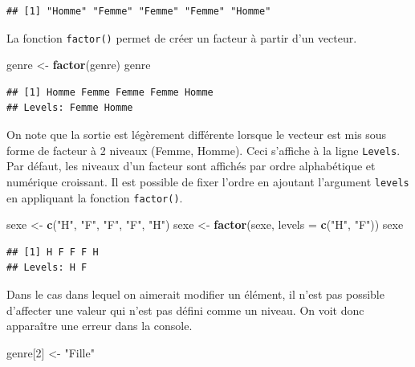 \documentclass[
]{book}
\newenvironment{Shaded}{\begin{snugshade}}{\end{snugshade}}
\newcommand{\AttributeTok}[1]{\textcolor[rgb]{0.13,0.29,0.53}{#1}}
\newcommand{\DecValTok}[1]{\textcolor[rgb]{0.00,0.00,0.81}{#1}}
\newcommand{\FunctionTok}[1]{\textcolor[rgb]{0.13,0.29,0.53}{\textbf{#1}}}
\newcommand{\NormalTok}[1]{#1}
\newcommand{\OtherTok}[1]{\textcolor[rgb]{0.56,0.35,0.01}{#1}}
\newcommand{\StringTok}[1]{\textcolor[rgb]{0.31,0.60,0.02}{#1}}
\begin{document}
\begin{verbatim}
## [1] "Homme" "Femme" "Femme" "Femme" "Homme"
\end{verbatim}

La fonction \texttt{factor()} permet de créer un facteur à partir d'un vecteur.

\begin{Shaded}
\begin{Highlighting}[]
\NormalTok{genre }\OtherTok{\textless{}{-}} \FunctionTok{factor}\NormalTok{(genre)}
\NormalTok{genre}
\end{Highlighting}
\end{Shaded}

\begin{verbatim}
## [1] Homme Femme Femme Femme Homme
## Levels: Femme Homme
\end{verbatim}

On note que la sortie est légèrement différente lorsque le vecteur est mis sous forme de facteur à 2 niveaux (Femme, Homme). Ceci s'affiche à la ligne \texttt{Levels}. Par défaut, les niveaux d'un facteur sont affichés par ordre alphabétique et numérique croissant. Il est possible de fixer l'ordre en ajoutant l'argument \texttt{levels} en appliquant la fonction \texttt{factor()}.

\begin{Shaded}
\begin{Highlighting}[]
\NormalTok{sexe }\OtherTok{\textless{}{-}} \FunctionTok{c}\NormalTok{(}\StringTok{"H"}\NormalTok{, }\StringTok{"F"}\NormalTok{, }\StringTok{"F"}\NormalTok{, }\StringTok{"F"}\NormalTok{, }\StringTok{"H"}\NormalTok{)}
\NormalTok{sexe }\OtherTok{\textless{}{-}} \FunctionTok{factor}\NormalTok{(sexe, }\AttributeTok{levels =} \FunctionTok{c}\NormalTok{(}\StringTok{"H"}\NormalTok{, }\StringTok{"F"}\NormalTok{))}
\NormalTok{sexe}
\end{Highlighting}
\end{Shaded}

\begin{verbatim}
## [1] H F F F H
## Levels: H F
\end{verbatim}

Dans le cas dans lequel on aimerait modifier un élément, il n'est pas possible d'affecter une valeur qui n'est pas défini comme un niveau. On voit donc apparaître une erreur dans la console.

\begin{Shaded}
\begin{Highlighting}[]
\NormalTok{genre[}\DecValTok{2}\NormalTok{] }\OtherTok{\textless{}{-}} \StringTok{"Fille"}
\end{Highlighting}
\end{Shaded}
\end{document}
